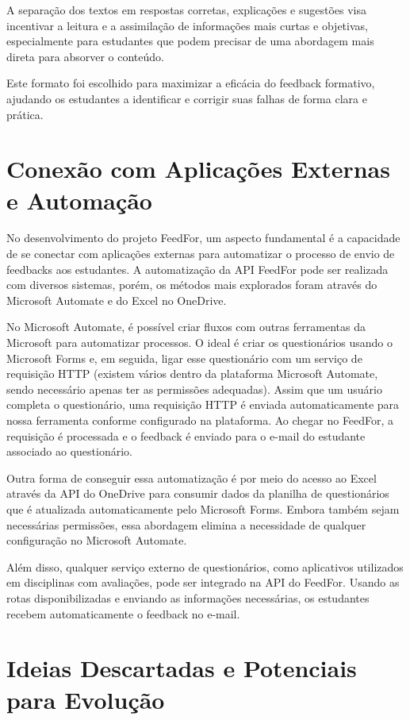 A separação dos textos em respostas corretas, explicações e sugestões visa incentivar a leitura e a assimilação de informações mais curtas e objetivas, especialmente para estudantes que podem precisar de uma abordagem mais direta para absorver o conteúdo.

Este formato foi escolhido para maximizar a eficácia do feedback formativo, ajudando os estudantes a identificar e corrigir suas falhas de forma clara e prática.

\section{Conexão com Aplicações Externas e Automação}

No desenvolvimento do projeto FeedFor, um aspecto fundamental é a capacidade de se conectar com aplicações externas para automatizar o processo de envio de feedbacks aos estudantes. A automatização da API FeedFor pode ser realizada com diversos sistemas, porém, os métodos mais explorados foram através do Microsoft Automate e do Excel no OneDrive.

No Microsoft Automate, é possível criar fluxos com outras ferramentas da Microsoft para automatizar processos. O ideal é criar os questionários usando o Microsoft Forms e, em seguida, ligar esse questionário com um serviço de requisição HTTP (existem vários dentro da plataforma Microsoft Automate, sendo necessário apenas ter as permissões adequadas). Assim que um usuário completa o questionário, uma requisição HTTP é enviada automaticamente para nossa ferramenta conforme configurado na plataforma. Ao chegar no FeedFor, a requisição é processada e o feedback é enviado para o e-mail do estudante associado ao questionário.

Outra forma de conseguir essa automatização é por meio do acesso ao Excel através da API do OneDrive para consumir dados da planilha de questionários que é atualizada automaticamente pelo Microsoft Forms. Embora também sejam necessárias permissões, essa abordagem elimina a necessidade de qualquer configuração no Microsoft Automate.

Além disso, qualquer serviço externo de questionários, como aplicativos utilizados em disciplinas com avaliações, pode ser integrado na API do FeedFor. Usando as rotas disponibilizadas e enviando as informações necessárias, os estudantes recebem automaticamente o feedback no e-mail.

\section{Ideias Descartadas e Potenciais para Evolução}

